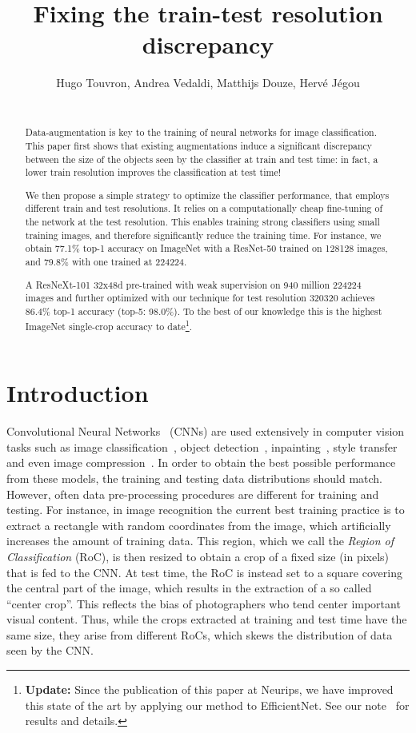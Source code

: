\documentclass{article}
\title{Fixing the train-test resolution discrepancy}
\date{}
\author{Hugo Touvron, Andrea Vedaldi, Matthijs Douze, Herv\'e J\'egou \\
~\\
\scalebox{1.}{Facebook AI Research}
}
\begin{document}
\maketitle
\begin{abstract}
Data-augmentation is key to the training of neural networks for image classification. 
This paper first shows that existing augmentations induce a significant discrepancy between the size of the objects seen by the classifier at train and test time: 
in fact, a lower train resolution improves the classification at test time!

We then propose a simple strategy to optimize the classifier performance, that employs different train and test resolutions. 
It relies on a computationally cheap fine-tuning of the network at the test resolution. 
This enables training strong classifiers using small training images, and therefore significantly reduce the training time.
For instance, we obtain 77.1\% top-1 accuracy on ImageNet with a ResNet-50 trained on 128128 images, and 79.8\% with one trained at 224224.

A ResNeXt-101 32x48d pre-trained with weak supervision on 940 million  224224 images and further optimized with our technique for test resolution 320320 achieves 86.4\% top-1 accuracy (top-5: 98.0\%). 
To the best of our  knowledge this is the highest ImageNet single-crop accuracy  to date\footnote{\textbf{Update:} Since the publication of this paper at Neurips, we have improved this state of the art by applying our method to EfficientNet. 
See our note~\cite{touvron2020FixEfficientNet} for results and details.}.
\end{abstract}

\section{Introduction}\label{sec:introduction}

Convolutional Neural Networks~\cite{lecun1989backpropagation} (CNNs) are used extensively in computer vision tasks such as image classification~\cite{Krizhevsky2012AlexNet}, object detection~\cite{ren2015faster}, inpainting~\cite{xie2012image}, style transfer~\cite{gatys2016image} and even image compression~\cite{rippel2017real}.  
In order to obtain the best possible performance from these models, the training and testing data distributions should match.
However, often data pre-processing procedures are different for training and testing.
For instance, in image recognition the current best training practice is to extract a rectangle with random coordinates from the image, which artificially increases the amount of training data.
This region, which we call the \emph{Region of Classification} (RoC), is then resized to obtain a crop of a fixed size (in pixels) that is fed to the CNN.
At test time, the RoC is instead set to a square covering the central part of the image, which results in the extraction of a so called  ``center crop''.
This reflects the bias of photographers who tend center important visual content.
Thus, while the crops extracted at training and test time have the same size, they arise from different RoCs, which skews the distribution of data seen by the CNN.
\end{document}
